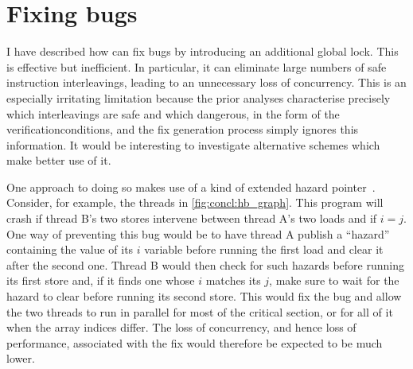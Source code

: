 \section{Fixing bugs}

I have described how {\technique} can fix bugs by introducing an
additional global lock.  This is effective but inefficient.  In
particular, it can eliminate large numbers of safe instruction
interleavings, leading to an unnecessary loss of concurrency.  This is
an especially irritating limitation because the prior analyses
characterise precisely which interleavings are safe and which
dangerous, in the form of the \glspl{verificationcondition}, and the
fix generation process simply ignores this information.  It would be
interesting to investigate alternative schemes which make better use
of it.


One approach to doing so makes use of a kind of extended hazard
pointer~\cite{Michael2004}.  Consider, for example, the threads in
\autoref{fig:concl:hb_graph}.  This program will crash if thread B's
two stores intervene between thread A's two loads and if $i = j$.  One
way of preventing this bug would be to have thread A publish a
``hazard'' containing the value of its $i$ variable before running the
first load and clear it after the second one.  Thread B would then
check for such hazards before running its first store and, if it finds
one whose $i$ matches its $j$, make sure to wait for the hazard to
clear before running its second store.  This would fix the bug and
allow the two threads to run in parallel for most of the critical
section, or for all of it when the array indices differ.  The loss of
concurrency, and hence loss of performance, associated with the fix
would therefore be expected to be much lower.

